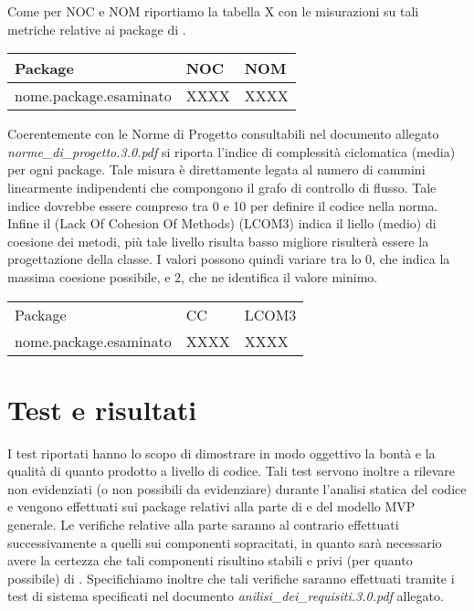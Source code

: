 Come per NOC e NOM riportiamo la tabella X con le misurazioni su tali metriche relative ai package di \caName{}.


\begin{center}
\begin{longtable}{p{}ll}
\toprule Package & NOC  & NOM\\
\midrule
nome.package.esaminato& XXXX & XXXX\\
\bottomrule
\end{longtable}
\end{center}


Coerentemente con le Norme di Progetto consultabili nel documento allegato \textit{norme\_di\_progetto.3.0.pdf} si riporta l'indice di complessità ciclomatica (media) per ogni package. Tale misura è direttamente legata al numero di cammini linearmente indipendenti che compongono il grafo di controllo di flusso. Tale indice dovrebbe essere compreso tra 0 e 10 per definire il codice nella norma.
Infine il \inglese(Lack Of Cohesion Of Methods) (LCOM3) indica il liello (medio) di coesione dei metodi, più tale livello risulta basso migliore risulterà essere la progettazione della classe. I valori possono quindi variare tra lo 0, che indica la massima coesione possibile, e 2, che ne identifica il valore minimo.


\begin{center}
\begin{longtable}{p{}ll}
\toprule Package & CC  & LCOM3\\
nome.package.esaminato& XXXX & XXXX\\
\midrule

\bottomrule
\end{longtable}
\end{center}


\section{Test e risultati}
I test riportati hanno lo scopo di dimostrare in modo oggettivo la bontà e la qualità di quanto prodotto a livello di codice. Tali test servono inoltre a rilevare  non evidenziati (o non possibili da evidenziare) durante l'analisi statica del codice e vengono effettuati sui package relativi alla parte di  e  del modello MVP generale.
Le verifiche relative alla parte  saranno al contrario effettuati successivamente a quelli sui componenti sopracitati, in quanto sarà necessario avere la certezza che tali componenti risultino stabili e privi (per quanto possibile) di . 
Specifichiamo inoltre che tali verifiche saranno effettuati tramite i test di sistema specificati nel documento \textit{anilisi\_dei\_requisiti.3.0.pdf} allegato.

